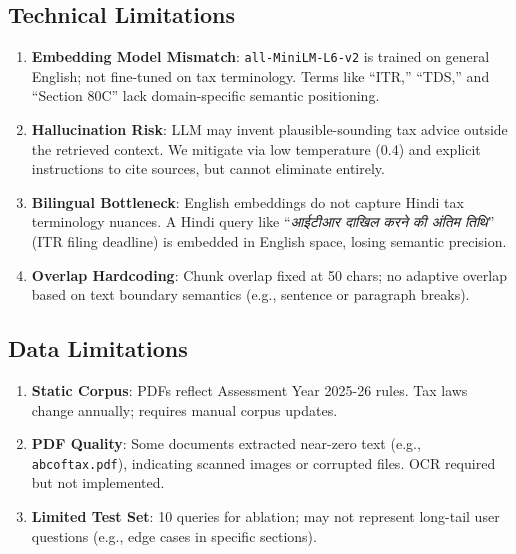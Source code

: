 \documentclass[11pt,a4paper]{article}
\begin{document}
\subsection{Technical Limitations}

\begin{enumerate}
    \item \textbf{Embedding Model Mismatch}: \texttt{all-MiniLM-L6-v2} is trained on general English; not fine-tuned on tax terminology. Terms like ``ITR,'' ``TDS,'' and ``Section 80C'' lack domain-specific semantic positioning.
    
    \item \textbf{Hallucination Risk}: LLM may invent plausible-sounding tax advice outside the retrieved context. We mitigate via low temperature (0.4) and explicit instructions to cite sources, but cannot eliminate entirely.
    
    \item \textbf{Bilingual Bottleneck}: English embeddings do not capture Hindi tax terminology nuances. A Hindi query like ``\textit{आईटीआर दाखिल करने की अंतिम तिथि}'' (ITR filing deadline) is embedded in English space, losing semantic precision.
    
    \item \textbf{Overlap Hardcoding}: Chunk overlap fixed at 50 chars; no adaptive overlap based on text boundary semantics (e.g., sentence or paragraph breaks).
\end{enumerate}

\subsection{Data Limitations}

\begin{enumerate}
    \item \textbf{Static Corpus}: PDFs reflect Assessment Year 2025-26 rules. Tax laws change annually; requires manual corpus updates.
    
    \item \textbf{PDF Quality}: Some documents extracted near-zero text (e.g., \texttt{abcoftax.pdf}), indicating scanned images or corrupted files. OCR required but not implemented.
    
    \item \textbf{Limited Test Set}: 10 queries for ablation; may not represent long-tail user questions (e.g., edge cases in specific sections).
\end{enumerate}
\end{document}
